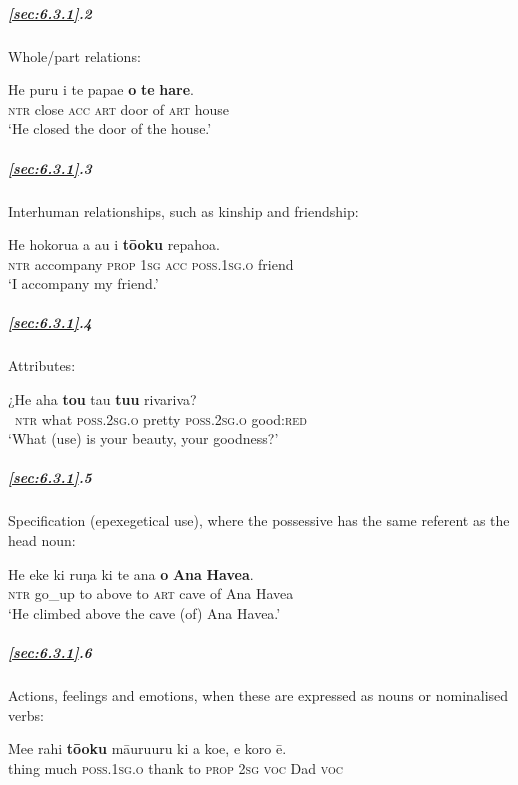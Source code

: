 \subparagraph{\ref{sec:6.3.1}.2} Whole/part relations:

\ea\label{ex:6.36}
\gll He puru i te papae \textbf{o} \textbf{te} \textbf{hare}. \\
\textsc{ntr} close \textsc{acc} \textsc{art} door of \textsc{art} house \\

\glt 
‘He closed the door of the house.’ \textstyleExampleref{[R310.144]} 
\z

\subparagraph{\ref{sec:6.3.1}.3} Interhuman relationships, such as kinship and friendship:

\ea\label{ex:6.37}
\gll He hokorua a au i \textbf{tō{\ꞌ}oku} repahoa.\\
\textsc{ntr} accompany \textsc{prop} \textsc{1sg} \textsc{acc} \textsc{poss.1sg.o} friend\\

\glt 
‘I accompany my friend.’ \textstyleExampleref{[R208.138]} 
\z

\subparagraph{\ref{sec:6.3.1}.4} Attributes:

\ea\label{ex:6.38}
\gll ¿He aha \textbf{to{\ꞌ}u} tau \textbf{tu{\ꞌ}u} rivariva? \\
~\textsc{ntr} what \textsc{poss.2sg.o} pretty \textsc{poss.2sg.o} good:\textsc{red} \\

\glt 
‘What (use) is your beauty, your goodness?’ \textstyleExampleref{[R372.045]} 
\z

\subparagraph{\ref{sec:6.3.1}.5} Specification (epexegetical use), where the possessive has the same referent as the head noun:

\ea\label{ex:6.39}
\gll He eke ki ruŋa ki te {\ꞌ}ana \textbf{o} \textbf{{\ꞌ}Ana} \textbf{Havea}. \\
\textsc{ntr} go\_up to above to \textsc{art} cave of Ana Havea \\

\glt 
‘He climbed above the cave (of) Ana Havea.’ \textstyleExampleref{[Mtx-7-18.010]}
\z

\subparagraph{\ref{sec:6.3.1}.6} Actions, feelings and emotions, when these are expressed as nouns or nominalised verbs:

\ea\label{ex:6.40}
\gll Me{\ꞌ}e rahi \textbf{tō{\ꞌ}oku} māuruuru ki a koe, e koro ē. \\
thing much \textsc{poss.1sg.o} thank to \textsc{prop} \textsc{2sg} \textsc{voc} Dad \textsc{voc} \\

